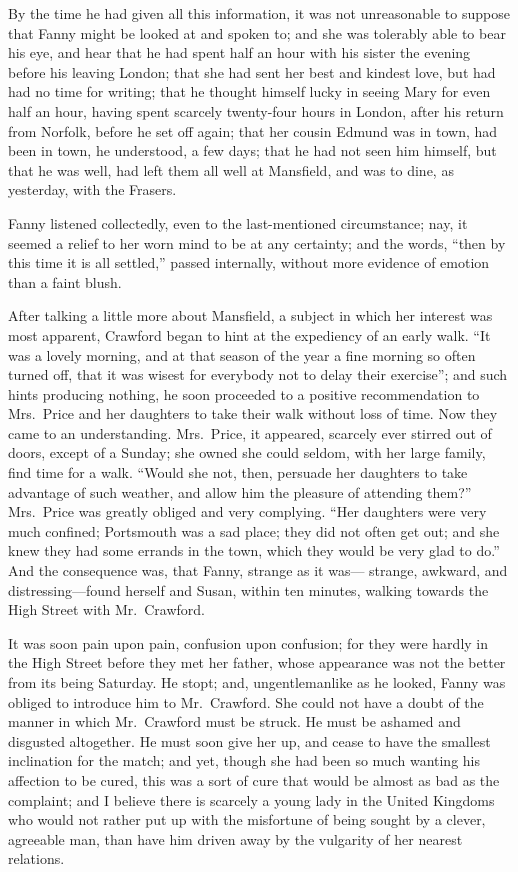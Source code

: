 By the time he had given all this information, it was not
unreasonable to suppose that Fanny might be looked at
and spoken to; and she was tolerably able to bear his eye,
and hear that he had spent half an hour with his sister
the evening before his leaving London; that she had sent
her best and kindest love, but had had no time for writing;
that he thought himself lucky in seeing Mary for even half
an hour, having spent scarcely twenty-four hours in London,
after his return from Norfolk, before he set off again;
that her cousin Edmund was in town, had been in town,
he understood, a few days; that he had not seen him himself,
but that he was well, had left them all well at Mansfield,
and was to dine, as yesterday, with the Frasers.

Fanny listened collectedly, even to the last-mentioned
circumstance; nay, it seemed a relief to her worn
mind to be at any certainty; and the words, ``then by
this time it is all settled,'' passed internally,
without more evidence of emotion than a faint blush.

After talking a little more about Mansfield, a subject
in which her interest was most apparent, Crawford began
to hint at the expediency of an early walk.  ``It was a
lovely morning, and at that season of the year a fine morning
so often turned off, that it was wisest for everybody not
to delay their exercise''; and such hints producing nothing,
he soon proceeded to a positive recommendation to Mrs.\ Price
and her daughters to take their walk without loss of time.
Now they came to an understanding.  Mrs.\ Price, it appeared,
scarcely ever stirred out of doors, except of a Sunday;
she owned she could seldom, with her large family,
find time for a walk.  ``Would she not, then, persuade her
daughters to take advantage of such weather, and allow
him the pleasure of attending them?''  Mrs.\ Price was
greatly obliged and very complying.  ``Her daughters
were very much confined; Portsmouth was a sad place;
they did not often get out; and she knew they had some
errands in the town, which they would be very glad to do.''
And the consequence was, that Fanny, strange as it was---%
strange, awkward, and distressing---found herself and Susan,
within ten minutes, walking towards the High Street
with Mr.\ Crawford.

It was soon pain upon pain, confusion upon confusion;
for they were hardly in the High Street before they met
her father, whose appearance was not the better from its
being Saturday.  He stopt; and, ungentlemanlike as he looked,
Fanny was obliged to introduce him to Mr.\ Crawford.
She could not have a doubt of the manner in which
Mr.\ Crawford must be struck.  He must be ashamed
and disgusted altogether.  He must soon give her up,
and cease to have the smallest inclination for the match;
and yet, though she had been so much wanting his affection
to be cured, this was a sort of cure that would be almost
as bad as the complaint; and I believe there is scarcely
a young lady in the United Kingdoms who would not rather
put up with the misfortune of being sought by a clever,
agreeable man, than have him driven away by the vulgarity
of her nearest relations.

